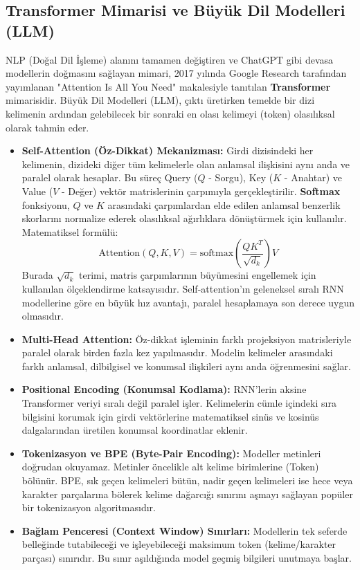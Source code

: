 \documentclass[11pt,a4paper,openany]{book}
\begin{document}
\subsection{Transformer Mimarisi ve Büyük Dil Modelleri (LLM)}
NLP (Doğal Dil İşleme) alanını tamamen değiştiren ve ChatGPT gibi devasa modellerin doğmasını sağlayan mimari, 2017 yılında Google Research tarafından yayımlanan "Attention Is All You Need" makalesiyle tanıtılan \textbf{Transformer} mimarisidir. Büyük Dil Modelleri (LLM), çıktı üretirken temelde bir dizi kelimenin ardından gelebilecek bir sonraki en olası kelimeyi (token) olasılıksal olarak tahmin eder.
\begin{itemize}
    \item \textbf{Self-Attention (Öz-Dikkat) Mekanizması:} Girdi dizisindeki her kelimenin, dizideki diğer tüm kelimelerle olan anlamsal ilişkisini aynı anda ve paralel olarak hesaplar. Bu süreç Query ($Q$ - Sorgu), Key ($K$ - Anahtar) ve Value ($V$ - Değer) vektör matrislerinin çarpımıyla gerçekleştirilir. \textbf{Softmax} fonksiyonu, $Q$ ve $K$ arasındaki çarpımlardan elde edilen anlamsal benzerlik skorlarını normalize ederek olasılıksal ağırlıklara dönüştürmek için kullanılır. Matematiksel formülü:
    $$\text{Attention}(Q, K, V) = \text{softmax}\left(\frac{QK^T}{\sqrt{d_k}}\right)V$$
    Burada $\sqrt{d_k}$ terimi, matris çarpımlarının büyümesini engellemek için kullanılan ölçeklendirme katsayısıdır. Self-attention'ın geleneksel sıralı RNN modellerine göre en büyük hız avantajı, paralel hesaplamaya son derece uygun olmasıdır.
    \item \textbf{Multi-Head Attention:} Öz-dikkat işleminin farklı projeksiyon matrisleriyle paralel olarak birden fazla kez yapılmasıdır. Modelin kelimeler arasındaki farklı anlamsal, dilbilgisel ve konumsal ilişkileri aynı anda öğrenmesini sağlar.
    \item \textbf{Positional Encoding (Konumsal Kodlama):} RNN'lerin aksine Transformer veriyi sıralı değil paralel işler. Kelimelerin cümle içindeki sıra bilgisini korumak için girdi vektörlerine matematiksel sinüs ve kosinüs dalgalarından üretilen konumsal koordinatlar eklenir.
    \item \textbf{Tokenizasyon ve BPE (Byte-Pair Encoding):} Modeller metinleri doğrudan okuyamaz. Metinler öncelikle alt kelime birimlerine (Token) bölünür. BPE, sık geçen kelimeleri bütün, nadir geçen kelimeleri ise hece veya karakter parçalarına bölerek kelime dağarcığı sınırını aşmayı sağlayan popüler bir tokenizasyon algoritmasıdır.
    \item \textbf{Bağlam Penceresi (Context Window) Sınırları:} Modellerin tek seferde belleğinde tutabileceği ve işleyebileceği maksimum token (kelime/karakter parçası) sınırıdır. Bu sınır aşıldığında model geçmiş bilgileri unutmaya başlar.
\end{itemize}
\end{document}
